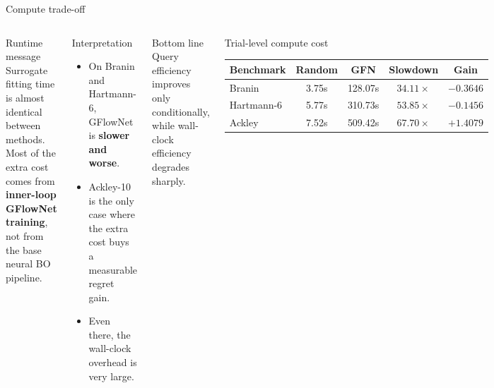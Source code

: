 \documentclass[aspectratio=169]{beamer}
\begin{document}
\begin{frame}{Compute trade-off}
\vspace{-0.55em}
\begin{columns}[T,onlytextwidth]
\begin{minipage}[t][0.80\textheight]{\linewidth}\vspace{0pt}
  \begin{card}{Runtime message}
  Surrogate fitting time is almost identical between methods. Most of the extra cost comes from \textbf{inner-loop GFlowNet training}, not from the base neural BO pipeline.
  \end{card}

  \vfill

  \begin{cardA}{Interpretation}
  \begin{itemize}
    \item On Branin and Hartmann-6, GFlowNet is \textbf{slower and worse}.
    \item Ackley-10 is the only case where the extra cost buys a measurable regret gain.
    \item Even there, the wall-clock overhead is very large.
  \end{itemize}
  \end{cardA}

  \vfill

  \begin{cardG}{Bottom line}
  Query efficiency improves only conditionally, while wall-clock efficiency degrades sharply.
  \end{cardG}
\end{minipage}

\begin{minipage}[t][0.80\textheight]{\linewidth}\vspace{0pt}
  \begin{cardW}{Trial-level compute cost}
  \centering
  \scriptsize
  \begin{tabular}{lcccc}
  \toprule
  Benchmark & Random & GFN & Slowdown & Gain \\
  \midrule
  Branin & 3.75s & 128.07s & $34.11\times$ & $-0.3646$ \\
  Hartmann-6 & 5.77s & 310.73s & $53.85\times$ & $-0.1456$ \\
  Ackley & 7.52s & 509.42s & $67.70\times$ & $+1.4079$ \\
  \bottomrule
  \end{tabular}
  \end{cardW}
\end{minipage}
\end{columns}
\end{frame}
\end{document}
